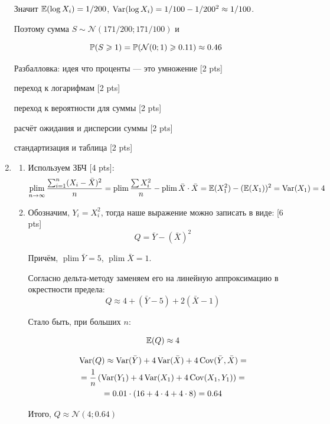 \documentclass[12pt, a4paper]{article}\usepackage[]{graphicx}\usepackage[]{color}
\DeclareMathOperator*\plim{plim}
\newcommand{\cN}{\mathcal{N}}
\begin{document}
\begin{enumerate}
							Значит $\mathbb{E}(\log X_i)=1/200$, $\operatorname{Var}(\log X_i)=1/100 - 1/200^2 \approx 1/100$.

							Поэтому сумма $S \sim \cN(171/200; 171/100)$ и

							\[
							\P(S \geq 1)=\P(\cN(0;1) \geq 0.11) \approx 0.46
							\]

							Разбалловка: идея что проценты — это умножение [2 pts]

							переход к логарифмам [2 pts]

							переход к вероятности для суммы [2 pts]

							расчёт ожидания и дисперсии суммы [2 pts]

							стандартизация и таблица [2 pts]


							\item
							\begin{enumerate}
								\item Используем ЗБЧ [4 pts]:
								\[
								\plim_{n \to \infty} \frac{\sum_{i=1}^n (X_i - \bar{X})^2}{n} = \plim \frac{\sum X_i^2}{n} - \plim \bar X \cdot \bar X = \E(X_1^2) - (\E(X_1))^2 = \Var(X_1) = 4
								\]
								\item Обозначим, $Y_i=X_i^2$, тогда наше выражение можно записать в виде: [6 pts]
								\[
								Q=\bar Y - (\bar X)^2
								\]

								Причём, $\plim \bar Y = 5$, $\plim \bar X = 1$.

								Согласно дельта-методу заменяем его на линейную аппроксимацию в окрестности предела:
								\[
								Q\approx 4 + (\bar Y - 5) + 2 (\bar X - 1)
								\]

								Стало быть, при больших $n$:

								\[
								\mathbb{E}(Q) \approx 4
								\]

								\begin{multline}
								\operatorname{Var}(Q) \approx \operatorname{Var}(\bar Y) + 4\operatorname{Var}(\bar X) + 4\operatorname{Cov}(\bar Y, \bar X) =\\
								= \frac{1}{n} \left(\operatorname{Var}(Y_1) + 4 \operatorname{Var}(X_1) + 4\operatorname{Cov}(X_1, Y_1) \right) = \\
								= 0.01 \cdot (16 + 4 \cdot 4 + 4 \cdot 8)= 0.64
								\end{multline}

								Итого, $Q \approx \cN(4; 0.64)$

							\end{enumerate}

						\end{enumerate}
\end{document}
